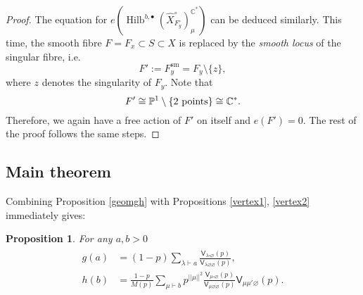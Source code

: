 \documentclass{amsart}
\newtheorem{proposition}[theorem]{Proposition}
\theoremstyle{definition}
\newcommand{\CC} {\mathbb{C}}          %
\newcommand{\PP} {\mathbb{P}}
\newcommand{\sfV}{\mathsf{V}}
\newcommand{\Hilb}{\operatorname{Hilb}}
\newcommand{\sm}{\operatorname{sm}}
\begin{document}
\begin{proof}
The equation for $e(\Hilb^{b,\bullet}(\widehat{X}^{\circ}_{F_{y}^{\circ}})_{\mu}^{\CC^*})$ can be deduced similarly. This time, the smooth fibre $F = F_x \subset S \subset X$ is replaced by the \emph{smooth locus} of the singular fibre, i.e.~ 
$$
F' := F_{y}^{\sm} = F_{y} \setminus \{z\},
$$
where $z$ denotes the singularity of $F_y$. Note that
$$
F' \cong \PP^1 \setminus \{2 \ \rm{points}\} \cong \CC^*.
$$
Therefore, we again have a free action of $F'$ on itself and $e(F') = 0$. The rest of the proof follows the same steps.
\end{proof}   


\subsection{Main theorem}

Combining Proposition \ref{geomgh} with Propositions \ref{vertex1}, \ref{vertex2} immediately gives:
\begin{proposition} \label{combgh}
For any $a,b>0$ 
\begin{align}
\begin{split} \label{gh}
g(a) &= (1-p) \sum_{\lambda \vdash a} \frac{\sfV_{\lambda\square\varnothing}(p)}{\sfV_{\lambda\varnothing\varnothing}(p)}, \\
h(b) &= \frac{1-p}{M(p)} \sum_{\mu \vdash b} p^{|\!|\mu|\!|^2} \frac{\sfV_{\mu\square\varnothing}(p)}{\sfV_{\mu\varnothing\varnothing}(p)} \sfV_{\mu\mu'\varnothing}(p).
\end{split}
\end{align}
\end{proposition}
\end{document}
